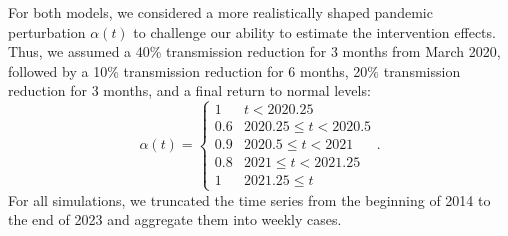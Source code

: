 \documentclass[12pt]{article}
\begin{document}
For both models, we considered a more realistically shaped pandemic perturbation $\alpha(t)$ to challenge our ability to estimate the intervention effects.
Thus, we assumed a 40\% transmission reduction for 3 months from March 2020, followed by a 10\% transmission reduction for 6 months, 20\% transmission reduction for 3 months, and a final return to normal levels:
\begin{equation}
\alpha(t) = \begin{cases}
1 & t < 2020.25\\
0.6 & 2020.25 \leq t < 2020.5\\
0.9 & 2020.5 \leq t < 2021\\
0.8 & 2021 \leq t < 2021.25\\
1 & 2021.25 \leq t
\end{cases}.
\end{equation}
For all simulations, we truncated the time series from the beginning of 2014 to the end of 2023 and aggregate them into weekly cases.
\end{document}
